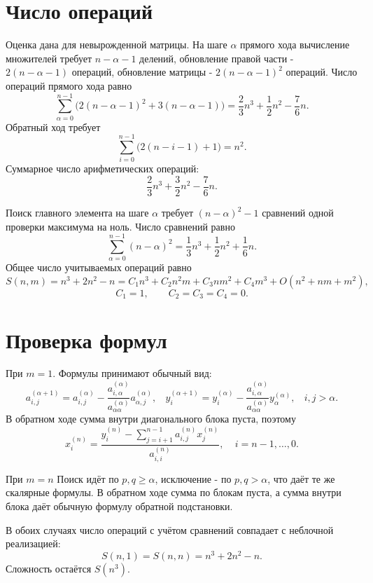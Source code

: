 \documentclass[a4paper,12pt]{article}
\begin{document}
\section{Число операций}
    Оценка дана для невырожденной матрицы. 
    На шаге $\alpha$ прямого хода вычисление множителей требует $n - \alpha - 1$ делений, обновление правой части - $2(n - \alpha - 1)$ операций, обновление матрицы - $2(n - \alpha - 1)^2$ операций. Число операций прямого хода равно
\[
    \sum_{\alpha = 0}^{n - 1}\bigl(2(n - \alpha - 1)^2 + 3(n - \alpha - 1)\bigr)
    = \frac{2}{3} n^3 + \frac{1}{2} n^2 - \frac{7}{6} n.
\]
Обратный ход требует
\[
    \sum_{i = 0}^{n - 1}\bigl(2(n - i - 1) + 1\bigr) = n^2.
\]
Суммарное число арифметических операций:
\[
    \frac{2}{3} n^3 + \frac{3}{2} n^2 - \frac{7}{6} n.
\]

Поиск главного элемента на шаге $\alpha$ требует $(n - \alpha)^2 - 1$ сравнений одной проверки максимума на ноль. Число сравнений равно
\[
    \sum_{\alpha = 0}^{n - 1}(n - \alpha)^2 = \frac{1}{3} n^3 + \frac{1}{2} n^2 + \frac{1}{6} n.
\]
Общее число учитываемых операций равно
\[
    S(n, m) = n^3 + 2 n^2 - n
    = C_1 n^3 + C_2 n^2 m + C_3 n m^2 + C_4 m^3 + O(n^2 + n m + m^2),
\]
\[
    \boxed{C_1 = 1, \qquad C_2 = C_3 = C_4 = 0.}
\]

\section{Проверка формул}
При $m = 1$. Формулы принимают обычный вид:
\[
    a_{i, j}^{(\alpha + 1)} = a_{i, j}^{(\alpha)} -
    \frac{a_{i, \alpha}^{(\alpha)}}{a_{\alpha \alpha}^{(\alpha)}} a_{\alpha, j}^{(\alpha)},
    \ \ \ \ 
    y_i^{(\alpha + 1)} = y_i^{(\alpha)} -
    \frac{a_{i, \alpha}^{(\alpha)}}{a_{\alpha \alpha}^{(\alpha)}} y_\alpha^{(\alpha)},
    \ \ \ \ i, j > \alpha.
\]
В обратном ходе сумма внутри диагонального блока пуста, поэтому
\[
    x_i^{(n)} = \frac{y_i^{(n)} - \sum_{j = i + 1}^{n - 1} a_{i, j}^{(n)} x_j^{(n)}}{a_{i, i}^{(n)}},
    \ \ \ \ \  i = n - 1, \ldots, 0.
\]

При $m = n$ Поиск идёт по $p, q \geq \alpha$, исключение - по $p, q > \alpha$, что даёт те же скалярные формулы. В обратном ходе сумма по блокам пуста, а сумма внутри блока даёт обычную формулу обратной подстановки.

В обоих случаях число операций с учётом сравнений совпадает с неблочной реализацией:
\[
    S(n, 1) = S(n, n) = n^3 + 2 n^2 - n.
\]
Сложность остаётся $S(n^3)$.
\end{document}
